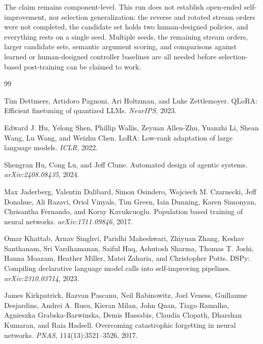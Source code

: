 \documentclass{article}
\begin{document}
The claim remains component-level. This run does not establish open-ended self-improvement, nor selection generalization: the reverse and rotated stream orders were not completed, the candidate set holds two human-designed policies, and everything rests on a single seed. Multiple seeds, the remaining stream orders, larger candidate sets, semantic argument scoring, and comparisons against learned or human-designed controller baselines are all needed before selection-based post-training can be claimed to work.

\small
\begin{thebibliography}{99}

Tim Dettmers, Artidoro Pagnoni, Ari Holtzman, and Luke Zettlemoyer.
\newblock QLoRA: Efficient finetuning of quantized LLMs.
\newblock \emph{NeurIPS}, 2023.

Edward J. Hu, Yelong Shen, Phillip Wallis, Zeyuan Allen-Zhu, Yuanzhi Li, Shean Wang, Lu Wang, and Weizhu Chen.
\newblock LoRA: Low-rank adaptation of large language models.
\newblock \emph{ICLR}, 2022.

Shengran Hu, Cong Lu, and Jeff Clune.
\newblock Automated design of agentic systems.
\newblock \emph{arXiv:2408.08435}, 2024.

Max Jaderberg, Valentin Dalibard, Simon Osindero, Wojciech M. Czarnecki, Jeff Donahue, Ali Razavi, Oriol Vinyals, Tim Green, Iain Dunning, Karen Simonyan, Chrisantha Fernando, and Koray Kavukcuoglu.
\newblock Population based training of neural networks.
\newblock \emph{arXiv:1711.09846}, 2017.

Omar Khattab, Arnav Singhvi, Paridhi Maheshwari, Zhiyuan Zhang, Keshav Santhanam, Sri Vardhamanan, Saiful Haq, Ashutosh Sharma, Thomas T. Joshi, Hanna Moazam, Heather Miller, Matei Zaharia, and Christopher Potts.
\newblock DSPy: Compiling declarative language model calls into self-improving pipelines.
\newblock \emph{arXiv:2310.03714}, 2023.

James Kirkpatrick, Razvan Pascanu, Neil Rabinowitz, Joel Veness, Guillaume Desjardins, Andrei A. Rusu, Kieran Milan, John Quan, Tiago Ramalho, Agnieszka Grabska-Barwinska, Demis Hassabis, Claudia Clopath, Dharshan Kumaran, and Raia Hadsell.
\newblock Overcoming catastrophic forgetting in neural networks.
\newblock \emph{PNAS}, 114(13):3521--3526, 2017.


\end{thebibliography}
\end{document}
